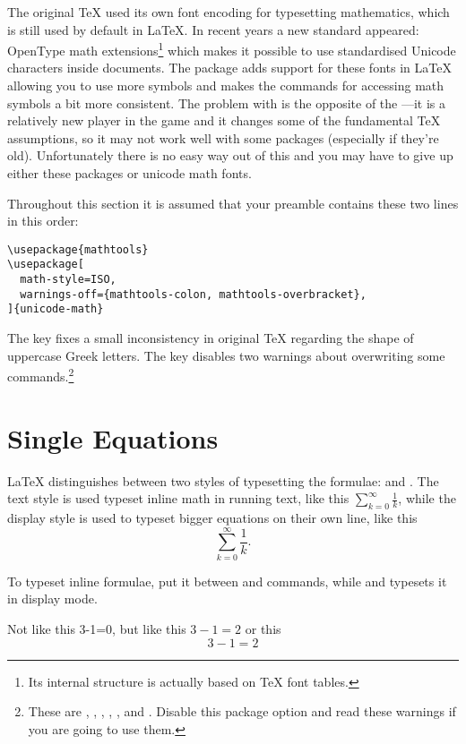 The original \TeX{} used its own font encoding for typesetting mathematics,
which is still used by default in \LaTeX{}. In recent years a new standard
appeared: OpenType math extensions\footnote{Its internal structure is actually
  based on \TeX{} font tables.} which makes it possible to use standardised
Unicode characters inside documents. The  package adds
support for these fonts in \LaTeX{} allowing you to use more symbols and makes
the commands for accessing math symbols a bit more consistent. The problem with
 is the opposite of the ---it is a relatively
new player in the game and it changes some of the fundamental \TeX{}
assumptions, so it may not work well with some packages (especially if they're
old). Unfortunately there is no easy way out of this and you may have to give
up either these packages or unicode math fonts.

Throughout this section it is assumed that your preamble contains these two
lines in this order:
\begin{verbatim}
\usepackage{mathtools}
\usepackage[
  math-style=ISO,
  warnings-off={mathtools-colon, mathtools-overbracket},
]{unicode-math}
\end{verbatim}
The  key fixes a small inconsistency in original \TeX{}
regarding the shape of uppercase Greek letters. The  key
disables two warnings about overwriting some 
commands.\footnote{These are , ,
  , , ,  and
  . Disable this package option and read these warnings if you are
  going to use them.}

\section{Single Equations}\label{sec:single_equations}

\LaTeX{} distinguishes between two styles of typesetting the formulae:
\emph{} and \emph{}. The text style is used
typeset inline math in running text, like this \(\sum_{k=0}^\infty
\frac{1}{k}\), while the display style is used to typeset bigger equations on
their own line, like this
\[
  \sum_{k=0}^\infty \frac{1}{k}.
\]

To typeset inline formulae, put it between \csi{(} and \csi{)} commands, while
\csi{[} and \csi{]} typesets it in display mode.
\begin{chktexignore}  
\begin{example}
Not like this 3-1=0,
but like this \(3-1=2\)
or this
\[
  3 - 1 = 2
\]
\end{example}
\end{chktexignore}

